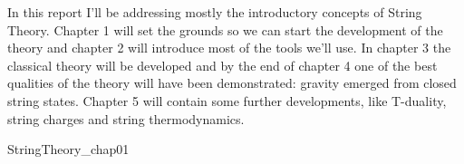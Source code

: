 \documentclass[oneside, 12pt, notitlepage]{book}
\begin{document}
\frontmatter
\pagestyle{empty}
\begin{notesabstract}[Abstract]
In this report I'll be addressing mostly the introductory concepts of String Theory. Chapter 1 will set the grounds so we can start the development of the theory and chapter 2 will introduce most of the tools we'll use. In chapter 3 the classical theory will be developed and by the end of chapter 4 one of the best qualities of the theory will have been demonstrated: gravity emerged from closed string states. Chapter 5 will contain some further developments, like T-duality, string charges and string thermodynamics.
\end{notesabstract}
\mainmatter
\pagestyle{mynotespage} %

{StringTheory_chap01}

%
%


\backmatter

\end{document}

